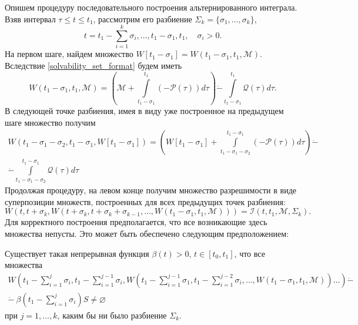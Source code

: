 Опишем процедуру последовательного построения альтернированного интеграла. Взяв
 интервал \( \tau \le t \le t_1 \), рассмотрим его разбиение \( \Sigma_k = \{ \sigma_1,
 \dots, \sigma_k \} \),
\begin{equation*}
    t = t_1 - \sum_{i=1}^k \sigma_i, \dots, t_1 - \sigma_1, t_1, \quad \sigma_i > 0.
\end{equation*}
На первом шаге, найдем множество \( W[t_1 - \sigma_1] = 
 W(t_1 - \sigma_1, t_1, \mathcal{M}) \). Вследствие \eqref{solvability_set_format}
 будем иметь
\begin{equation*}
     W(t_1 - \sigma_1, t_1, \mathcal{M}) = \left( \mathcal{M} + \int\limits_{t_1 - \sigma_1}
     ^{t_1}(-\mathcal{P}(\tau)) d\tau \right) \dot{-} \int\limits_{t_1 - \sigma_1}^{t_1}
     \mathcal{Q}(\tau)d\tau.
\end{equation*}
В следующей точке разбиения, имея в виду уже построенное на предыдущем шаге множество получим
\begin{equation*}
    \begin{gathered}
        W(t_1 - \sigma_1 -\sigma_2, t_1 - \sigma_1, W[t_1 - \sigma_1]) = \left( W[t_1 - \sigma_1]
        + \int\limits_{t_1 - \sigma_1 - \sigma_2}^{t_1 - \sigma_1} (-\mathcal{P}(\tau))d\tau \right)
        \dot{-} \\
        \dot{-} \int\limits_{t_1 - \sigma_1 - \sigma_2}^{t_1 - \sigma_1} \mathcal{Q}(\tau) d\tau
    \end{gathered}
\end{equation*}
Продолжая процедуру, на левом конце получим множество разрешимости в виде суперпозиции множеств, 
 построенных для всех предыдущих точек разбиения:
\begin{equation*}
    W(t, t + \sigma_k, W(t + \sigma_k, t + \sigma_k + \sigma_{k-1}, \dots, W(t_1 - \sigma_1, t_1,
    \mathcal{M}))) = \mathcal{I}(t, t_1, \mathcal{M}, \Sigma_k).
\end{equation*}
Для корректного построения предполагается, что все возникающие здесь множества непусты. Это может 
 быть обеспечено следующим предположением:
\begin{assumption}\label{assumption_nonempty}
    Существует такая непрерывная функция \( \beta(t) > 0, \, t \in [t_0, t_1] \), что все
     множества
    \begin{equation}
        \begin{gathered}
            W \left( t_1 - \sum_{i=1}^j\sigma_i, t_1 - \sum_{i = 1}^{j - 1}\sigma_i, W 
             \left( t_1 - \sum_{i = 1}^ {j - 1} \sigma_1, t_1 - \sum_{i = 1}^{j - 2} 
             \sigma_i, \dots, W(t_1 - \sigma_1, t_1, \mathcal{M}) \right) \dots \right)
             \dot{-} \\
            \dot{-} \ \beta \left( t_1 - \sum_{i = 1}^j \sigma_i
             \right) S \ne \varnothing 
        \end{gathered}
    \end{equation}
    при \( j = 1, \dots, k \), каким бы ни было разбиение \( \Sigma_k \).
\end{assumption}

